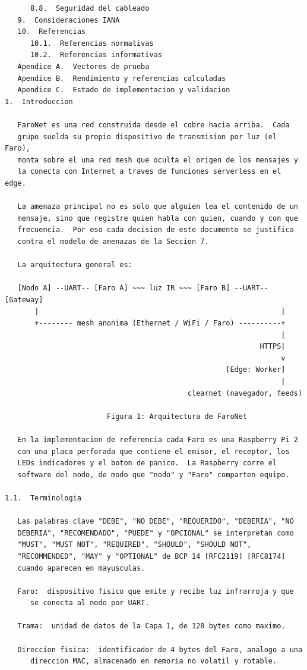 \begin{Verbatim}
      8.8.  Seguridad del cableado
   9.  Consideraciones IANA
   10.  Referencias
      10.1.  Referencias normativas
      10.2.  Referencias informativas
   Apendice A.  Vectores de prueba
   Apendice B.  Rendimiento y referencias calculadas
   Apendice C.  Estado de implementacion y validacion
1.  Introduccion

   FaroNet es una red construida desde el cobre hacia arriba.  Cada
   grupo suelda su propio dispositivo de transmision por luz (el Faro),
   monta sobre el una red mesh que oculta el origen de los mensajes y
   la conecta con Internet a traves de funciones serverless en el edge.

   La amenaza principal no es solo que alguien lea el contenido de un
   mensaje, sino que registre quien habla con quien, cuando y con que
   frecuencia.  Por eso cada decision de este documento se justifica
   contra el modelo de amenazas de la Seccion 7.

   La arquitectura general es:

   [Nodo A] --UART-- [Faro A] ~~~ luz IR ~~~ [Faro B] --UART-- [Gateway]
       |                                                         |
       +-------- mesh anonima (Ethernet / WiFi / Faro) ----------+
                                                                 |
                                                            HTTPS|
                                                                 v
                                                    [Edge: Worker]
                                                                 |
                                           clearnet (navegador, feeds)

                        Figura 1: Arquitectura de FaroNet

   En la implementacion de referencia cada Faro es una Raspberry Pi 2
   con una placa perforada que contiene el emisor, el receptor, los
   LEDs indicadores y el boton de panico.  La Raspberry corre el
   software del nodo, de modo que "nodo" y "Faro" comparten equipo.

1.1.  Terminologia

   Las palabras clave "DEBE", "NO DEBE", "REQUERIDO", "DEBERIA", "NO
   DEBERIA", "RECOMENDADO", "PUEDE" y "OPCIONAL" se interpretan como
   "MUST", "MUST NOT", "REQUIRED", "SHOULD", "SHOULD NOT",
   "RECOMMENDED", "MAY" y "OPTIONAL" de BCP 14 [RFC2119] [RFC8174]
   cuando aparecen en mayusculas.

   Faro:  dispositivo fisico que emite y recibe luz infrarroja y que
      se conecta al nodo por UART.

   Trama:  unidad de datos de la Capa 1, de 128 bytes como maximo.

   Direccion fisica:  identificador de 4 bytes del Faro, analogo a una
      direccion MAC, almacenado en memoria no volatil y rotable.
\end{Verbatim}
